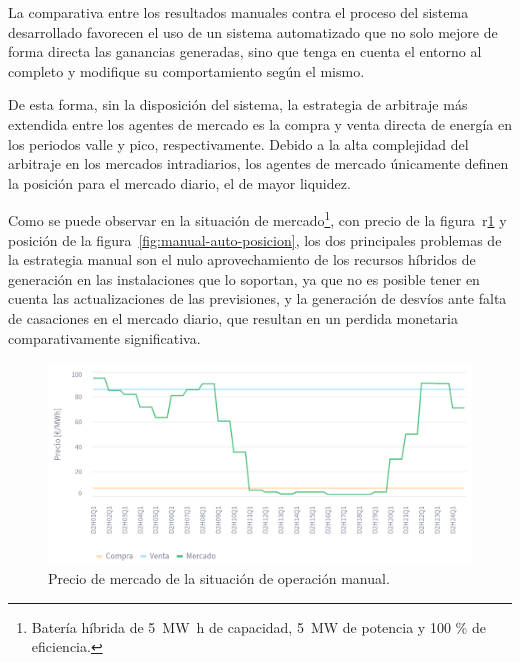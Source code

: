 La comparativa entre los resultados manuales contra el proceso del sistema desarrollado favorecen el uso de un sistema automatizado que no solo mejore de forma directa las ganancias generadas, sino que tenga en cuenta el entorno al completo y modifique su comportamiento según el mismo.

De esta forma, sin la disposición del sistema, la estrategia de arbitraje más extendida entre los agentes de mercado es la compra y venta directa de energía en los periodos valle y pico, respectivamente. Debido a la alta complejidad del arbitraje en los mercados intradiarios, los agentes de mercado únicamente definen la posición para el mercado diario, el de mayor liquidez.

Como se puede observar en la situación de mercado\footnote{Batería híbrida de \SI{5}{{\mega\watt\hour}} de capacidad, \SI{5}{{\mega\watt}} de potencia y 100 \% de eficiencia.}, con precio de la figura~r\ref{fig:manual-auto-precio} y posición de la figura~\ref{fig:manual-auto-posicion}, los dos principales problemas de la estrategia manual son el nulo aprovechamiento de los recursos híbridos de generación en las instalaciones que lo soportan, ya que no es posible tener en cuenta las actualizaciones de las previsiones, y la generación de desvíos ante falta de casaciones en el mercado diario, que resultan en un perdida monetaria comparativamente significativa.

\begin{figure}
  \centering
  \includegraphics[width=0.75\linewidth]{figures/manual-auto-precio.png}
  \caption[Precio de mercado de la situación de operación manual.]{Precio de mercado de la situación de operación manual.}%
  \label{fig:manual-auto-precio}
\end{figure}

